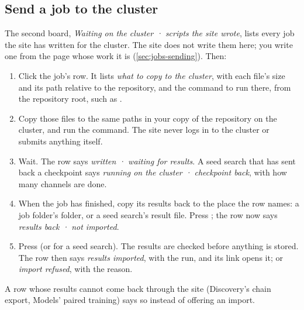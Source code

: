 \subsection{Send a job to the cluster}\label{sec:jobs-cluster}
The second board, \emph{Waiting on the cluster · scripts the site wrote}, lists every job the site
has written for the cluster. The site does not write them here; you write one from the page whose
work it is (\cref{sec:jobs-sending}). Then:
\begin{enumerate}
\item Click the job's row. It lists \emph{what to copy to the cluster}, with each file's size and
  its path relative to the repository, and the command to run there, from the repository root, such
  as .
\item Copy those files to the same paths in your copy of the repository on the cluster, and run
  the command. The site never logs in to the cluster or submits anything itself.
\item Wait. The row says \emph{written · waiting for results}. A seed search that has sent back a
  checkpoint says \emph{running on the cluster · checkpoint back}, with how many channels are done.
\item When the job has finished, copy its results back to the place the row names: a job folder's
   folder, or a seed search's result file. Press ; the row now says
  \emph{results back · not imported}.
\item Press  (or  for a seed search). The results are checked
  before anything is stored. The row then says \emph{results imported}, with the run, and its link
  opens it; or \emph{import refused}, with the reason.
\end{enumerate}
A row whose results cannot come back through the site (Discovery's chain export, Models' paired
training) says so instead of offering an import.


